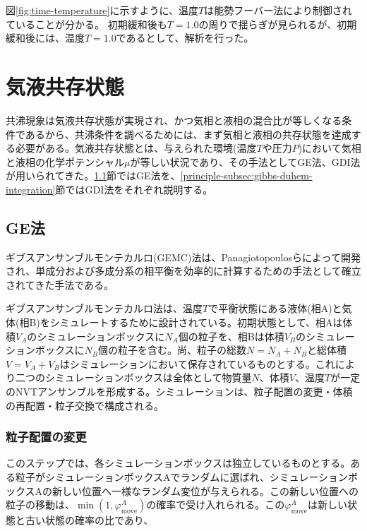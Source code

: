 \documentclass[titlepage]{jsreport}
\begin{document}
\newpage
図\ref{fig:time-temperature}に示すように、温度$T$は能勢フーバー法により制御されていることが分かる。
初期緩和後も$T=1.0$の周りで揺らぎが見られるが、初期緩和後には、温度$T=1.0$であるとして、解析を行った。


\section{気液共存状態} \label{principle-sec:gas-liquid-coexistence}
共沸現象は気液共存状態が実現され、かつ気相と液相の混合比が等しくなる条件であるから、共沸条件を調べるためには、まず気相と液相の共存状態を達成する必要がある。気液共存状態とは、与えられた環境(温度$T$や圧力$P$)において気相と液相の化学ポテンシャル$\mu$が等しい状況であり、その手法としてGE法、GDI法が用いられてきた。\ref{principle-subsec:gibbs-ensemble}節ではGE法を、\ref{principle-subsec:gibbs-duhem-integration}節ではGDI法をそれぞれ説明する。

\subsection{GE法} \label{principle-subsec:gibbs-ensemble}
ギブスアンサンブルモンテカルロ(GEMC)法は、Panagiotopoulosらによって開発され\cite{gibbs-ensemble-panagiotopoulos-1,gibbs-ensemble-panagiotopoulos-2}、単成分および多成分系の相平衡を効率的に計算するための手法として確立されてきた手法である\cite{gibbs-ensemble-phase-equilibrium-1,gibbs-ensemble-phase-equilibrium-2}。

ギブスアンサンブルモンテカルロ法は、温度$T$で平衡状態にある液体(相A)と気体(相B)をシミュレートするために設計されている\cite{gibbs-ensemble-panagiotopoulos-2}。初期状態として、相Aは体積$V_A$のシミュレーションボックスに$N_A$個の粒子を、相Bは体積$V_B$のシミュレーションボックスに$N_B$個の粒子を含む。尚、粒子の総数$N=N_A+N_B$と総体積$V=V_A+V_B$はシミュレーションにおいて保存されているものとする。これにより二つのシミュレーションボックスは全体として物質量$N$、体積$V$、温度$T$が一定のNVTアンサンブルを形成する。シミュレーションは、粒子配置の変更・体積の再配置・粒子交換で構成される。

\subsubsection{粒子配置の変更}\label{principle-subsubsec:particle-displacement}
このステップでは、各シミュレーションボックスは独立しているものとする。ある粒子がシミュレーションボックスAでランダムに選ばれ、シミュレーションボックスAの新しい位置へ一様なランダム変位が与えられる。この新しい位置への粒子の移動は、$\min(1, \varphi_\mathrm{move}^A)$の確率で受け入れられる。この$\varphi_\mathrm{move}^A$は新しい状態と古い状態の確率の比であり、
\end{document}
